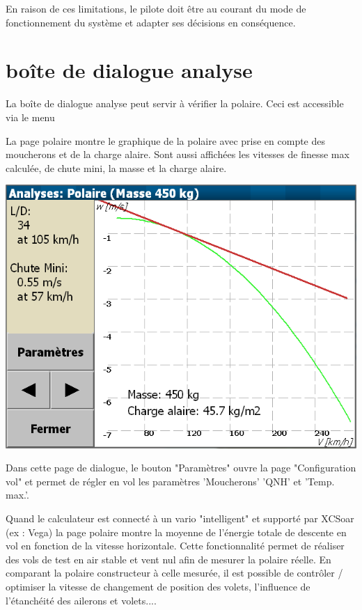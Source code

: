 En raison de ces limitations, le pilote doit être au courant du mode de fonctionnement du système et adapter ses décisions en conséquence.

\section{boîte de dialogue analyse}

La boîte de dialogue analyse peut servir à vérifier la polaire.  Ceci est accessible via le menu
\begin{quote}
\blink{}
\end{quote}

La page polaire montre le graphique de la polaire avec prise en compte des moucherons et de la charge alaire. Sont aussi affichées les vitesses de finesse max calculée, de chute mini, la masse et la charge alaire.

\begin{center}
\includegraphics[angle=0,width=0.8\linewidth,keepaspectratio='true']{figures/analysis-glidepolar.png}
\end{center}

Dans cette page de dialogue, le bouton "Paramètres" ouvre la page "Configuration vol" et permet de régler en vol les paramètres 'Moucherons' 'QNH' et 'Temp. max.'.

Quand le calculateur est connecté à un vario "intelligent" et supporté par XCSoar (ex : Vega) la page polaire montre la moyenne de l'énergie totale de descente en vol en fonction de la vitesse horizontale. Cette fonctionnalité permet de réaliser des vols de test en air stable et vent nul afin de mesurer la polaire réelle. En comparant la polaire constructeur à celle mesurée, il est possible de contrôler / optimiser la vitesse de changement de position des volets, l'influence de l'étanchéité des ailerons et volets....  

